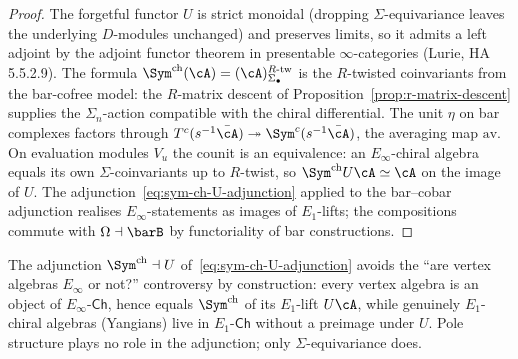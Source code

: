 \begin{proof}
The forgetful functor $U$ is strict monoidal (dropping
$\Sigma$-equivariance leaves the underlying $D$-modules unchanged)
and preserves limits, so it admits a left adjoint by the adjoint
functor theorem in presentable $\infty$-categories (Lurie, HA
5.5.2.9). The formula
$\Sym^{\mathrm{ch}}(\cA) = (\cA)_{\Sigma_\bullet}^{R\text{-tw}}$
is the $R$-twisted coinvariants from the bar-cofree model: the
$R$-matrix descent of Proposition~\ref{prop:r-matrix-descent}
supplies the $\Sigma_n$-action compatible with the chiral
differential. The unit $\eta$ on bar complexes factors through
$T^c(s^{-1}\bar\cA) \twoheadrightarrow \Sym^c(s^{-1}\bar\cA)$, the
averaging map $\mathrm{av}$. On evaluation modules $V_u$ the
counit is an equivalence: an $E_\infty$-chiral algebra equals its
own $\Sigma$-coinvariants up to $R$-twist, so $\Sym^{\mathrm{ch}}
U \cA \simeq \cA$ on the image of $U$. The
adjunction~\eqref{eq:sym-ch-U-adjunction} applied to the bar--cobar
adjunction realises $E_\infty$-statements as images of $E_1$-lifts;
the compositions commute with $\Omega\dashv\barB$ by functoriality
of bar constructions.
\end{proof}

\begin{remark}
\label{rem:e1-primacy-v2-ap1-compat}
The adjunction $\Sym^{\mathrm{ch}}\dashv U$
of~\eqref{eq:sym-ch-U-adjunction} avoids the ``are vertex algebras
$E_\infty$ or not?'' controversy by construction: every vertex
algebra is an object of $E_\infty\text{-}\mathsf{Ch}$, hence equals
$\Sym^{\mathrm{ch}}$ of its $E_1$-lift $U\cA$, while genuinely
$E_1$-chiral algebras (Yangians) live in $E_1\text{-}\mathsf{Ch}$
without a preimage under $U$. Pole structure plays no role in the
adjunction; only $\Sigma$-equivariance does.
\end{remark}

